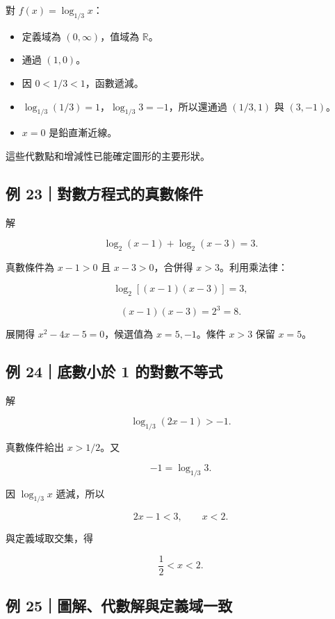 \documentclass[11pt,a4paper]{article}
\providecommand{\tightlist}{%
  \setlength{\itemsep}{0pt}\setlength{\parskip}{0pt}}
\begin{document}
對 \(f(x)=\log_{1/3}x\)：

\begin{itemize}
\tightlist
\item
  定義域為 \((0,\infty)\)，值域為 \(\mathbb R\)。
\item
  通過 \((1,0)\)。
\item
  因 \(0<1/3<1\)，函數遞減。
\item
  \(\log_{1/3}(1/3)=1\)，\(\log_{1/3}3=-1\)，所以還通過 \((1/3,1)\) 與 \((3,-1)\)。
\item
  \(x=0\) 是鉛直漸近線。
\end{itemize}

這些代數點和增減性已能確定圖形的主要形狀。

\subsection{例 23｜對數方程式的真數條件}\label{ux4f8b-23ux5c0dux6578ux65b9ux7a0bux5f0fux7684ux771fux6578ux689dux4ef6}

解

\[
\log_2(x-1)+\log_2(x-3)=3.
\]

真數條件為 \(x-1>0\) 且 \(x-3>0\)，合併得 \(x>3\)。利用乘法律：

\[
\log_2[(x-1)(x-3)]=3,
\]

\[
(x-1)(x-3)=2^3=8.
\]

展開得 \(x^2-4x-5=0\)，候選值為 \(x=5,-1\)。條件 \(x>3\) 保留 \(x=5\)。

\subsection{例 24｜底數小於 1 的對數不等式}\label{ux4f8b-24ux5e95ux6578ux5c0fux65bc-1-ux7684ux5c0dux6578ux4e0dux7b49ux5f0f}

解

\[
\log_{1/3}(2x-1)>-1.
\]

真數條件給出 \(x>1/2\)。又

\[
-1=\log_{1/3}3.
\]

因 \(\log_{1/3}x\) 遞減，所以

\[
2x-1<3,\qquad x<2.
\]

與定義域取交集，得

\[
\frac12<x<2.
\]

\subsection{例 25｜圖解、代數解與定義域一致}\label{ux4f8b-25ux5716ux89e3ux4ee3ux6578ux89e3ux8207ux5b9aux7fa9ux57dfux4e00ux81f4}
\end{document}
